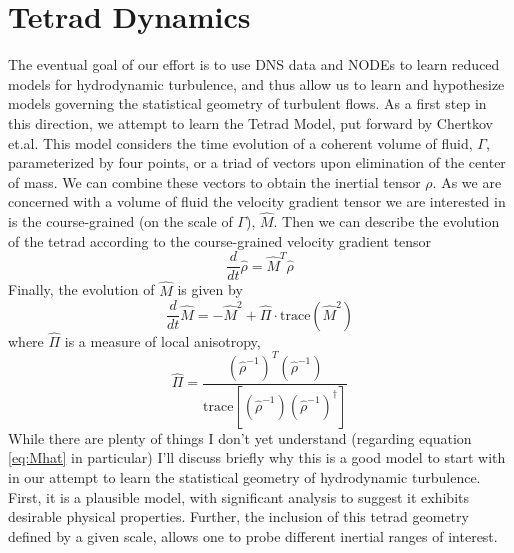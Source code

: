 \documentclass{amsart}
\newcommand{\trace}{\text{trace}}
\begin{document}
\section{Tetrad Dynamics}
The eventual goal of our effort is to use DNS data and NODEs to learn reduced models for hydrodynamic turbulence, and thus allow us to learn and hypothesize models governing the statistical geometry of turbulent flows. As a first step in this direction, we attempt to learn the Tetrad Model, put forward by Chertkov et.al. This model considers the time evolution of a coherent volume of fluid, $\Gamma$, parameterized by four points, or a triad of vectors upon elimination of the center of mass. We can combine these vectors to obtain the inertial tensor $\rho$. As we are concerned with a volume of fluid the velocity gradient tensor we are interested in is the course-grained (on the scale of $\Gamma$), $\hat M$. Then we can describe the evolution of the tetrad according to the course-grained velocity gradient tensor
\begin{equation}
  \frac{d}{dt}\hat \rho = \hat M^T\hat \rho
\end{equation}
Finally, the evolution of $\hat M$ is given by
\begin{equation}
  \frac{d}{dt}\hat M = -\hat M^2 + \hat \Pi \cdot \trace(\hat M^2)\label{eq:Mhat}
\end{equation}
where $\hat \Pi$ is a measure of local anisotropy,
\begin{equation}
  \hat \Pi = \frac{\left(\hat\rho^{-1}\right)^T \left(\hat\rho^{-1}\right)}{\trace\left[\left(\hat\rho^{-1}\right)\left(\hat\rho^{-1}\right)^\dagger\right]}
\end{equation}
\indent While there are plenty of things I don't yet understand (regarding equation \ref{eq:Mhat} in particular) I'll discuss briefly why this is a good model to start with in our attempt to learn the statistical geometry of hydrodynamic turbulence. First, it is a plausible model, with significant analysis to suggest it exhibits desirable physical properties. Further, the inclusion of this tetrad geometry defined by a given scale, allows one to probe different inertial ranges of interest.
\end{document}
